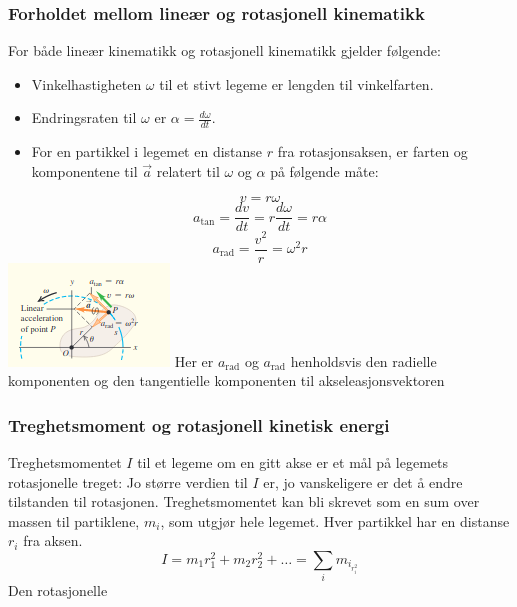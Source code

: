 \subsubsection{Forholdet mellom lineær og rotasjonell kinematikk}
For både lineær kinematikk og rotasjonell kinematikk gjelder følgende:\newline\newline
\begin{itemize}
    \item Vinkelhastigheten $\omega$ til et stivt legeme er lengden til vinkelfarten.
    \item Endringsraten til $\omega$ er $\alpha=\frac{d\omega}{dt}.$
    \item For en partikkel i legemet en distanse $r$ fra rotasjonsaksen, er farten og komponentene til $\vec{a}$ relatert til $\omega$ og $\alpha$ på følgende måte:
\end{itemize}
\begin{equation}
    v=r\omega
\end{equation}
\begin{equation}
    a_{\text{tan}}=\frac{dv}{dt}=r\frac{d\omega}{dt}=r\alpha
\end{equation}
\begin{equation}
    a_{\text{rad}}=\frac{v^2}{r}=\omega^2r
\end{equation}
\includegraphics{rapport/teori/bilder/tang.png}\newline
Her er $a_\text{rad}$ og $a_\text{rad}$ henholdsvis den radielle komponenten og den tangentielle komponenten til akseleasjonsvektoren \cite{FYSIKK:1}

\subsubsection{Treghetsmoment og rotasjonell kinetisk energi}
Treghetsmomentet $I$ til et legeme om en gitt akse er et mål på legemets rotasjonelle treget: Jo større verdien til $I$ er, jo vanskeligere er det å endre tilstanden til rotasjonen. Treghetsmomentet kan bli skrevet som en sum over massen til partiklene, $m_i$, som utgjør hele legemet. Hver partikkel har en distanse $r_i$ fra aksen.
\begin{equation}
    I=m_1r_1^2+m_2r_2^2+\dots=\sum_i{m_i_r_i^2}
\end{equation}
Den rotasjonelle 